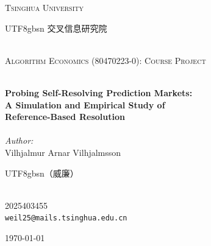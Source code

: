 \begin{titlepage}
\vbox{ }
\vbox{ }
\begin{center}

\textsc{\Large Tsinghua University}\\[0.3cm]
\begin{CJK}{UTF8}{gbsn}
\textsc{\large 交叉信息研究院}
\end{CJK}\\[0.4cm]
\textsc{\large Algorithm Economics (80470223-0): Course Project}\\[1.5cm]
\vbox{ }

\HRule \\[0.4cm]
{ \huge \bfseries Probing Self-Resolving Prediction Markets:\\[0.2cm]
A Simulation and Empirical Study of\\ Reference-Based Resolution}\\[0.4cm]
\HRule \\[1.5cm]

\large
\emph{Author:}\\
Vilhjalmur Arnar Vilhjalmsson
\begin{CJK}{UTF8}{gbsn}（威廉）\end{CJK}\\
2025403455 \\
\texttt{weil25@mails.tsinghua.edu.cn}
\vfill

{\large \today}
\end{center}
\end{titlepage}
